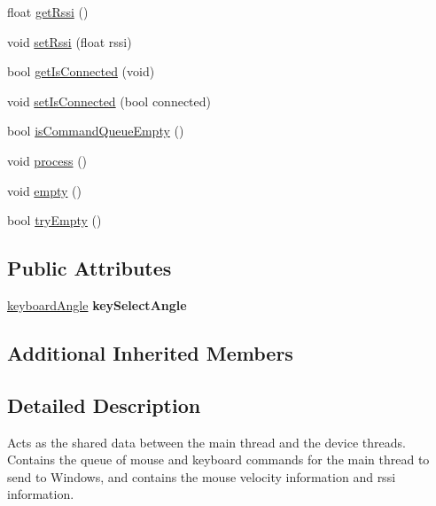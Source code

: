 \begin{DoxyCompactItemize}
\item 
float \hyperlink{class_shared_command_data_a82c2de924b98658e0fb43ffc6d8dd4ad}{get\+Rssi} ()
\item 
void \hyperlink{class_shared_command_data_ac044dd9567691ef9e0f0b6c98a399c5e}{set\+Rssi} (float rssi)
\item 
bool \hyperlink{class_shared_command_data_a20c85aaabaf7ab3d86f111bda016229a}{get\+Is\+Connected} (void)
\item 
void \hyperlink{class_shared_command_data_a36b1cb2ebebf923c84d584554c7f7be1}{set\+Is\+Connected} (bool connected)
\item 
bool \hyperlink{class_shared_command_data_aaeab9090c2a66327a15ecc8e122a724f}{is\+Command\+Queue\+Empty} ()
\item 
void \hyperlink{class_shared_command_data_a3085d27336d75f8e1974206585f831dd}{process} ()
\item 
void \hyperlink{class_shared_command_data_a775e0044954cca68f93734b2af5456fa}{empty} ()
\item 
bool \hyperlink{class_shared_command_data_a0f7888c05ad83842bcf8de4e0b234037}{try\+Empty} ()
\end{DoxyCompactItemize}
\subsection*{Public Attributes}
\begin{DoxyCompactItemize}
\item 
\hypertarget{class_shared_command_data_a57707d5bd34133c5dc4725a34590afd2}{\hyperlink{structkeyboard_angle}{keyboard\+Angle} {\bfseries key\+Select\+Angle}}\label{class_shared_command_data_a57707d5bd34133c5dc4725a34590afd2}

\end{DoxyCompactItemize}
\subsection*{Additional Inherited Members}


\subsection{Detailed Description}
Acts as the shared data between the main thread and the device threads. Contains the queue of mouse and keyboard commands for the main thread to send to Windows, and contains the mouse velocity information and rssi information. 

